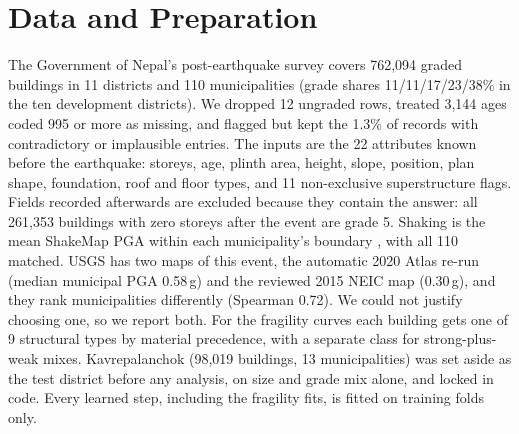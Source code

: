 \documentclass{article}
\begin{document}
\section{Data and Preparation}
The Government of Nepal's post-earthquake survey \citep{nepaldata} covers 762,094 graded buildings in 11 districts
and 110 municipalities (grade shares 11/11/17/23/38\% in the ten development districts). We dropped 12 ungraded
rows, treated 3,144 ages coded 995 or more as missing, and flagged but kept the 1.3\% of records with
contradictory or implausible entries. The inputs are the 22 attributes known before the earthquake: storeys, age,
plinth area, height, slope, position, plan shape, foundation, roof and floor types, and 11 non-exclusive
superstructure flags. Fields recorded afterwards are excluded because they contain the answer: all 261,353
buildings with zero storeys after the event are grade 5. Shaking is the mean ShakeMap PGA \citep{shakemap} within
each municipality's boundary \citep{boundaries}, with all 110 matched. USGS has two maps of this event, the
automatic 2020 Atlas re-run (median municipal PGA 0.58\,g) and the reviewed 2015 NEIC map
(0.30\,g), and they rank municipalities differently (Spearman 0.72). We could not justify choosing one, so we
report both. For the fragility curves each building gets one of 9 structural types by material precedence, with
a separate class for strong-plus-weak mixes. Kavrepalanchok (98,019 buildings, 13 municipalities) was set aside
as the test district before any analysis, on size and grade mix alone, and locked in code. Every learned step,
including the fragility fits, is fitted on training folds only.
\end{document}
